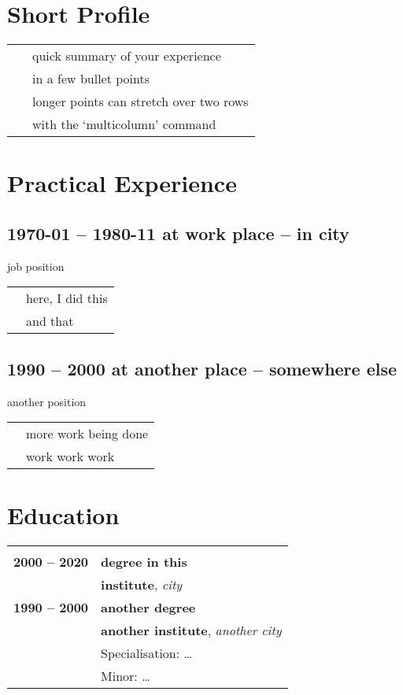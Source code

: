 \documentclass[a4paper,12pt]{article}
\begin{document}
\section*{Short Profile}
\begin{tabular}{r@{•\ \ }l}
    & quick summary of your experience \\
    & in a few bullet points\\
    & longer points can stretch over two rows \\
    \multicolumn{1}{c}{\ } &
      with the `multicolumn' command \\
\end{tabular}

\section*{Practical Experience}

\subsection{1970-01 -- 1980-11 at work place -- in city}
job position\\
\begin{tabular}{r@{•\ \ }l}
    & here, I did this\\
    & and that
\end{tabular}

\subsection{1990 -- 2000 at another place -- somewhere else}
another position\\
\begin{tabular}{r@{•\ \ }l}
    & more work being done\\
    & work work work
\end{tabular}

\section*{Education}
\begin{tabular}{rl}
    \vspace{-12pt}\hspace*{3cm}\\
    \textbf{2000 -- 2020}
        & \textbf{degree in this}\\
        & \textbf{institute}, \textit{city}\\
    \textbf{1990 -- 2000}
        & \textbf{another degree}\\
        & \textbf{another institute}, \textit{another city}\\
        & Specialisation: \dots\\
        & Minor: \dots\\
\end{tabular}
\end{document}
